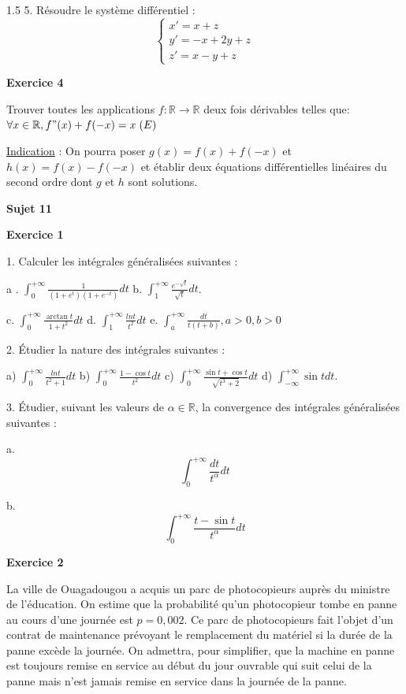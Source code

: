 \documentclass[12pt]{article}
\begin{document}
\begin{spacing}{1.5}
5. Résoudre le système différentiel :
\[
\begin{cases}
x'=x+z\\
y'=-x+2y+z\\
z'=x-y+z
\end{cases}
\]

\medskip\textbf{Exercice 4 }

Trouver toutes les applications $f :\mathbb{R} \longrightarrow \mathbb{R}$ deux fois dérivables telles que: 
$\forall x \in \mathbb{R} , f"(x) + f(-x) = x \hspace{0.1cm}(E)$

\underline{Indication} : On pourra poser
$g(x) = f(x) + f(-x)$ et $h(x) = f(x) -f(-x)$ et établir deux équations différentielles linéaires du second ordre dont $g$ et $h$ sont solutions.


\quad
\quad

\medskip\textbf{Sujet 11}

\textbf{Exercice 1}

1. Calculer les intégrales généralisées suivantes :

a . $\int_{0}^{+\infty}\frac{1}{(1+e^t)(1+e^{-t})}dt$ \hspace{1cm} b. $\int_{1}^{+\infty}\frac{e^{-\sqrt{t}}}{\sqrt{t}}dt$.

\medskip c. $\int_{0}^{+\infty}\frac{\arctan t}{1+t^2}dt$ \hspace{1cm}d. $\int_{1}^{+\infty}\frac{lnt}{t^2}dt$ \hspace{1cm}e. $\int_{a}^{+\infty}\frac{dt}{t(t+b)},a>0,b>0$



2. Étudier la nature des intégrales suivantes :

a) $\int_0^{+\infty}\frac{lnt}{t^2+1}dt$ \hspace{1cm}b) $\int_0^{+\infty}\frac{1-\cos t}{t^2}dt$ \hspace{1cm}c) $\int_0^{+\infty}\frac{\sin t+\cos t}{\sqrt{t^3+2}}dt$ \hspace{1cm}d) $\int_{-\infty}^{+\infty}\sin t dt$.

3. Étudier, suivant les valeurs de $\alpha\in\mathbb{R}$, la convergence des intégrales généralisées suivantes :

a. \[\int_0^{+\infty}\frac{dt}{t^{\alpha}}dt\]


b. \[\int_0^{+\infty}\frac{t-\sin t}{t^{\alpha}}dt\]


\textbf{Exercice 2}

 La ville de Ouagadougou a acquis un parc de photocopieurs auprès du ministre de l'éducation. On estime que la probabilité qu'un photocopieur tombe en panne au cours d'une journée est $p=0,002$. Ce parc de photocopieurs fait l'objet d'un contrat de maintenance prévoyant le remplacement du matériel si la durée de la panne excède la journée. On admettra, pour simplifier, que la machine en panne est toujours remise en service au début du jour ouvrable qui suit celui de la panne mais n'est jamais remise en service dans la journée de la panne.


\end{spacing}
\end{document}
